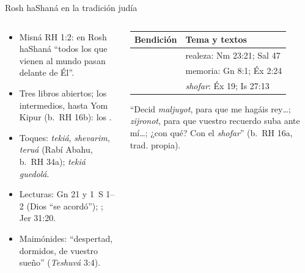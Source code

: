 \begin{frame}{Rosh haShaná en la tradición judía}
\begin{columns}[t,onlytextwidth]
\begin{column}{0.50\textwidth}\scriptsize\RaggedRight
\begin{itemize}
\item Misná RH 1:2: en Rosh haShaná ``todos los que vienen al mundo pasan delante de Él''.
\item Tres libros abiertos; los intermedios, hasta Yom Kipur (b.~RH 16b): los .
\item Toques: \emph{tekiá}, \emph{shevarim}, \emph{teruá} (Rabí Abahu, b.~RH 34a); \emph{tekiá guedolá}.
\item Lecturas: Gn 21 y 1~S 1--2 (Dios ``se acordó''); ; Jer 31:20.
\item Maimónides: ``despertad, dormidos, de vuestro sueño'' (\emph{Teshuvá} 3:4).
\end{itemize}
\end{column}
\begin{column}{0.48\textwidth}
\scriptsize\renewcommand{\arraystretch}{1.12}
\begin{tabular}{@{}L{1.7cm}L{3.5cm}@{}}
\toprule
\textbf{Bendición} & \textbf{Tema y textos} \\ \midrule
{} & realeza: Nm 23:21; Sal 47 \\
 & memoria: Gn 8:1; Éx 2:24 \\
 & \emph{shofar}: Éx 19; Is 27:13 \\
\bottomrule
\end{tabular}\par\smallskip
{\fontsize{6}{7}\selectfont ``Decid \emph{maljuyot}, para que me hagáis rey\ldots; \emph{zijronot}, para que vuestro recuerdo suba ante mí\ldots; ¿con qué? Con el \emph{shofar}'' (b.~RH 16a, trad. propia).}
\end{column}
\end{columns}\par\smallskip
{}
\end{frame}


